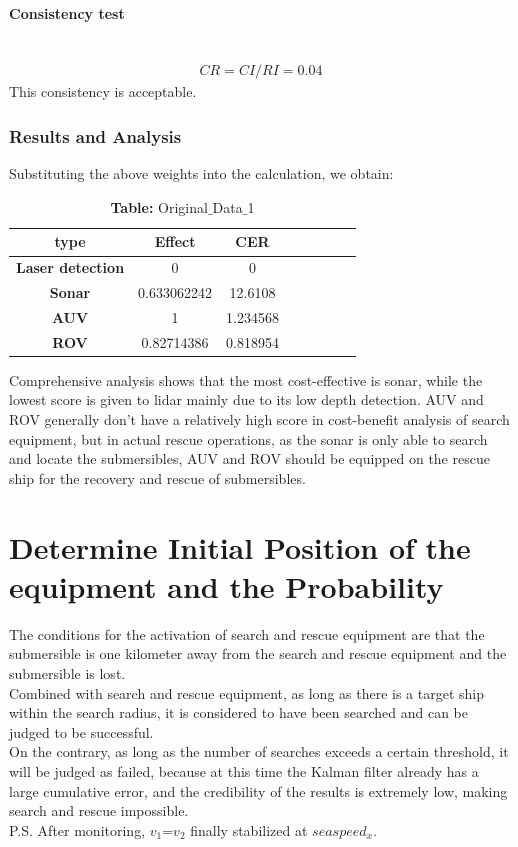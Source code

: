 \documentclass[12pt]{article}  %
\newcommand{\subsubsubsection}[1]{\paragraph{#1}\mbox{}\\}
\begin{document}
  \subsubsubsection{Consistency test}
  \begin{equation}
    \begin{aligned}
     CR =  {CI/RI} =0.04
     \end{aligned}
    \end{equation}
  \indent This consistency is acceptable.

  \subsubsection{Results and Analysis}
  \indent Substituting the above weights into the calculation, we obtain:

  \begin{table}[H]
    \centering
    \caption*{\textbf{Table:} Original$\_$Data$\_$1}
    \begin{tabular}{|c|c|c|c|c|c|c|c|}
        \hline
        \textbf{type}  & \textbf{Effect} & \textbf{CER}  \\ \hline
        \textbf{Laser detection}  & 0    & 0    \\ \hline
        \textbf{Sonar}  & 0.633062242 &12.6108 \\ \hline
        \textbf{AUV}  & 1& 1.234568  \\ \hline
        \textbf{ROV}  & 0.82714386    & 0.818954           \\ \hline
    \end{tabular}
\end{table}

\indent Comprehensive analysis shows that the most cost-effective is sonar, while the lowest score is given to lidar mainly due to its low depth detection.
AUV and ROV generally don’t have a relatively high score in cost-benefit analysis of search equipment, but in actual rescue operations, as the sonar is only able to search and locate the submersibles, AUV and ROV should be equipped on the rescue ship for the recovery and rescue of submersibles.

\section{Determine Initial Position of the equipment and the Probability}%

The conditions for the activation of search and rescue equipment are that the submersible is one kilometer away from the search and rescue equipment and the submersible is lost.\\
\indent Combined with search and rescue equipment, as long as there is a target ship within the search radius, it is considered to have been searched and can be judged to be successful.\\
\indent On the contrary, as long as the number of searches exceeds a certain threshold, it will be judged as failed, because at this time the Kalman filter already has a large cumulative error, and the credibility of the results is extremely low, making search and rescue impossible.\\
\indent P.S. After monitoring, $v_1$=$v_2$ finally stabilized at $seaspeed_x$.
\end{document}

